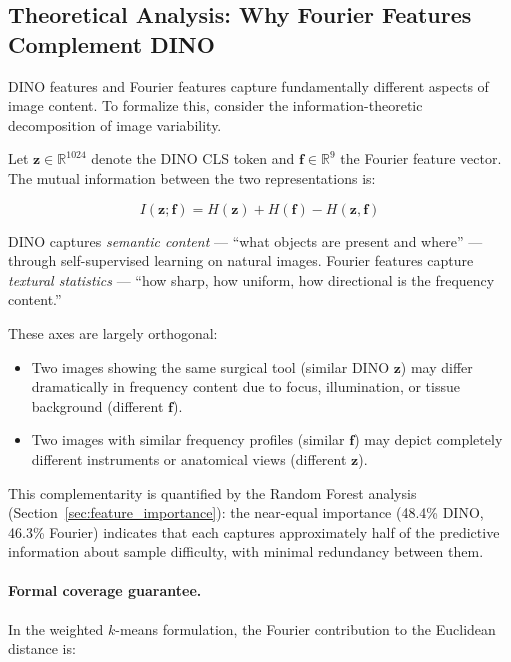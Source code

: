 \subsection{Theoretical Analysis: Why Fourier Features Complement DINO}
\label{sec:complementarity}

DINO features and Fourier features capture fundamentally different aspects of
image content.  To formalize this, consider the information-theoretic
decomposition of image variability.

Let $\mathbf{z} \in \mathbb{R}^{1024}$ denote the DINO CLS token and
$\mathbf{f} \in \mathbb{R}^9$ the Fourier feature vector.  The mutual
information between the two representations is:

\begin{equation}
    I(\mathbf{z}; \mathbf{f}) = H(\mathbf{z}) + H(\mathbf{f})
                               - H(\mathbf{z}, \mathbf{f})
\end{equation}

DINO captures \emph{semantic content} --- ``what objects are present and where''
--- through self-supervised learning on natural images.  Fourier features
capture \emph{textural statistics} --- ``how sharp, how uniform, how
directional is the frequency content.''

These axes are largely orthogonal:

\begin{itemize}
    \item Two images showing the same surgical tool (similar DINO
          $\mathbf{z}$) may differ dramatically in frequency content due to
          focus, illumination, or tissue background (different
          $\mathbf{f}$).
    \item Two images with similar frequency profiles (similar $\mathbf{f}$)
          may depict completely different instruments or anatomical views
          (different $\mathbf{z}$).
\end{itemize}

This complementarity is quantified by the Random Forest analysis
(Section~\ref{sec:feature_importance}): the near-equal importance
(48.4\% DINO, 46.3\% Fourier) indicates that each captures approximately
half of the predictive information about sample difficulty, with minimal
redundancy between them.

\paragraph{Formal coverage guarantee.}
In the weighted $k$-means formulation, the Fourier contribution to the
Euclidean distance is:

